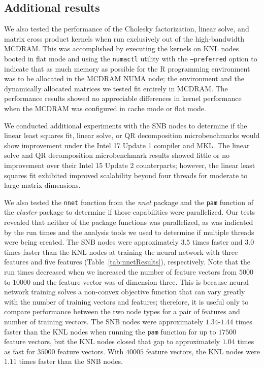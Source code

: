 \subsection{Additional results}

We also tested the performance of the Cholesky factorization, linear solve, and matrix
cross product kernels when run exclusively out of the high-bandwidth MCDRAM. This was
accomplished by executing the kernels on KNL nodes booted in flat mode and using the
\texttt{numactl} utility with the \texttt{--preferred} option to indicate that as much
memory as possible for the R programming environment was to be allocated in the MCDRAM
NUMA node; the environment and the dynamically allocated matrices we tested fit entirely
in MCDRAM. The performance results showed no appreciable differences in kernel performance
when the MCDRAM was configured in cache mode or flat mode.

We conducted additional experiments with the SNB nodes to determine if the linear least
squares fit, linear solve, or QR decomposition microbenchmarks would show improvement
under the Intel 17 Update 1 compiler and MKL. The linear solve and QR decomposition
microbenchmark results showed little or no improvement over their Intel 15 Update 2
counterparts; however, the linear least squares fit exhibited improved scalability beyond
four threads for moderate to large matrix dimensions.

We also tested the \texttt{nnet} function from the \textit{nnet} package and the
\texttt{pam} function of the \textit{cluster} package to determine if those capabilities
were parallelized. Our tests revealed that neither of the package functions was
parallelized, as was indicated by the run times and the analysis tools we used to
determine if multiple threads were being created. The SNB nodes were approximately $3.5$
times faster and $3.0$ times faster than the KNL nodes at training the neural network with
three features and five features (Table~\ref{tab:nnetResults}), respectively. Note that
the run times decreased when we increased the number of feature vectors from $5000$ to
$10000$ and the feature vector was of dimension three. This is because neural network
training solves a non-convex objective function that can vary greatly with the number of
training vectors and features; therefore, it is useful only to compare performance between
the two node types for a pair of features and number of training vectors. The SNB nodes
were approximately $1.34$-$1.44$ times faster than the KNL nodes when running the
\texttt{pam} function for up to $17500$ feature vectors, but the KNL nodes closed that gap
to approximately $1.04$ times as fast for $35000$ feature vectors. With $40005$ feature
vectors, the KNL nodes were $1.11$ times faster than the SNB nodes.

